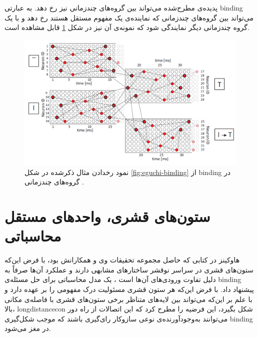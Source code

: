 \documentclass[12pt]{report}
\begin{document}
	پدیده‌ی مطرح‌شده می‌تواند بین گروه‌های چندزمانی نیز رخ دهد. به عبارتی \gls{binding} می‌تواند بین گروه‌های چندزمانی که نماینده‌ی یک مفهوم مستقل هستند رخ دهد و با یک گروه چندزمانی دیگر نمایندگی شود که نمونه‌ی آن نیز در شکل \ref{fig:eguchi-binding-group} قابل مشاهده است.
	
	\begin{figure}[H]
		\centering
		\includegraphics[width=1.0\linewidth]{poly-group-bind.png}
		\caption[NS]{
			نمود رخدادن مثال ذکر‌شده در شکل \ref{fig:eguchi-binding}  از \gls{binding} در گروه‌های چند‌زمانی \cite{EGUCHI2018a}.
		}
		\label{fig:eguchi-binding-group}
	\end{figure}
	
	\section{ستون‌های قشری، واحد‌های مستقل محاسباتی}
	\label{section:hawkins}
	
	هاوکینز در کتابی \cite{Hawkins2021-rq} که حاصل مجموعه تحقیقات‌ وی و همکارانش
	\cite{Hawkins2016, Hawkins2017, Lewis2019}
	بود، با فرض این‌که ستون‌های قشری در سراسر نوقشر ساختار‌های مشابهی دارند و عملکرد آن‌ها صرفاً به دلیل تفاوت ورودی‌های آن‌ها است \cite{Mountcastle1978}، یک مدل محاسباتی برای حل مسئله‌ی \gls{binding} پیشنهاد داد. با فرض این‌که هر ستون قشری مسئولیت درک مفهومی را بر عهده دارد و با علم بر این‌که می‌تواند بین لایه‌های متناظر برخی ستون‌های قشری با فاصله‌ی مکانی بالا، \gls{longdistancecon} شکل بگیرد، این فرضیه را مطرح کرد که این اتصالات از راه دور می‌توانند به‌وجود‌آورنده‌ی نوعی سازوکار رای‌گیری باشند که  موجب شکل‌گیری \gls{binding} در مغز می‌شود.
	
\end{document}
